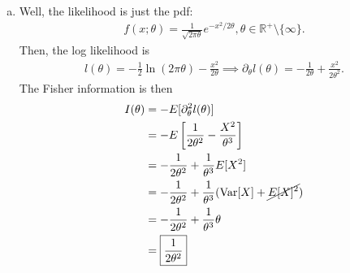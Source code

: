 \documentclass{book}
\theoremstyle{definition}
\newcommand{\p}{\partial}
\newcommand{\nn}{\nonumber}
\newcommand{\Var}{\text{Var}}
\newcommand{\f}[2]{\frac{#1}{#2}}
\newcommand{\lb}{\left[}
\newcommand{\rb}{\right]}
\begin{document}
\begin{enumerate}[(a)]
	\item Well, the likelihood is just the pdf:
	\begin{align}
	f(x;\theta) = \f{1}{\sqrt{2\pi \theta}}e^{-x^2/2\theta}, \theta \in \mathbb{R}^+\setminus\{\infty\}.
	\end{align}
	Then, the log likelihood is
	\begin{align}
	l(\theta) = -\f{1}{2}\ln (2\pi \theta) - \f{x^2}{2\theta} \implies \p_\theta l(\theta)  = -\f{1}{2\theta} + \f{x^2}{2\theta^2}.
	\end{align}
	The Fisher information is then 
	\begin{align}
	I(\theta) &= -E[\p^2_\theta l(\theta)]\nn\\
	&= -E\lb \f{1}{2\theta^2} - \f{X^2}{\theta^3}   \rb\nn\\
	&= -\f{1}{2\theta^2} + \f{1}{\theta^3} E[X^2]\nn\\
	&= -\f{1}{2\theta^2} + \f{1}{\theta^3} (\Var[X] + \cancel{E[X]^2})\nn\\
	&= -\f{1}{2\theta^2} + \f{1}{\theta^3} \theta\nn\\
	&= \boxed{\f{1}{2\theta^2}}
	\end{align}
	

\end{enumerate}
\end{document}
